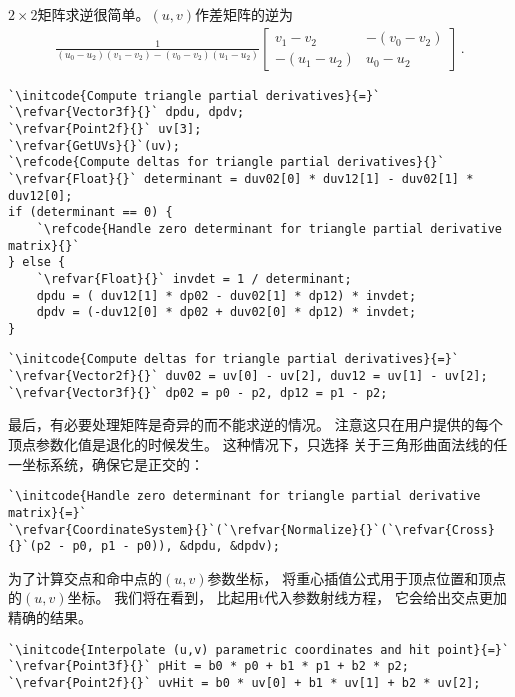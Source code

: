 $2\times2$矩阵求逆很简单。$(u,v)$作差矩阵的逆为
\begin{align*}
    \frac{1}{(u_0-u_2)(v_1-v_2)-(v_0-v_2)(u_1-u_2)}\left[\begin{array}{cc}
            v_1-v_2    & -(v_0-v_2) \\
            -(u_1-u_2) & u_0-u_2
        \end{array}\right]\, .
\end{align*}
\begin{lstlisting}
`\initcode{Compute triangle partial derivatives}{=}`
`\refvar{Vector3f}{}` dpdu, dpdv;
`\refvar{Point2f}{}` uv[3];
`\refvar{GetUVs}{}`(uv);
`\refcode{Compute deltas for triangle partial derivatives}{}`
`\refvar{Float}{}` determinant = duv02[0] * duv12[1] - duv02[1] * duv12[0];
if (determinant == 0) {
    `\refcode{Handle zero determinant for triangle partial derivative matrix}{}`
} else {
    `\refvar{Float}{}` invdet = 1 / determinant;
    dpdu = ( duv12[1] * dp02 - duv02[1] * dp12) * invdet;
    dpdv = (-duv12[0] * dp02 + duv02[0] * dp12) * invdet;
}
\end{lstlisting}
\begin{lstlisting}
`\initcode{Compute deltas for triangle partial derivatives}{=}`
`\refvar{Vector2f}{}` duv02 = uv[0] - uv[2], duv12 = uv[1] - uv[2];
`\refvar{Vector3f}{}` dp02 = p0 - p2, dp12 = p1 - p2;
\end{lstlisting}

最后，有必要处理矩阵是奇异的而不能求逆的情况。
注意这只在用户提供的每个顶点参数化值是退化的时候发生。
这种情况下，只选择
关于三角形曲面法线的任一坐标系统，确保它是正交的：
\begin{lstlisting}
`\initcode{Handle zero determinant for triangle partial derivative matrix}{=}`
`\refvar{CoordinateSystem}{}`(`\refvar{Normalize}{}`(`\refvar{Cross}{}`(p2 - p0, p1 - p0)), &dpdu, &dpdv);
\end{lstlisting}

为了计算交点和命中点的$(u,v)$参数坐标，
将重心插值公式用于顶点位置和顶点的$(u,v)$坐标。
我们将在看到，
比起用{\ttfamily t}代入参数射线方程，
它会给出交点更加精确的结果。
\begin{lstlisting}
`\initcode{Interpolate (u,v) parametric coordinates and hit point}{=}`
`\refvar{Point3f}{}` pHit = b0 * p0 + b1 * p1 + b2 * p2;
`\refvar{Point2f}{}` uvHit = b0 * uv[0] + b1 * uv[1] + b2 * uv[2];
\end{lstlisting}

